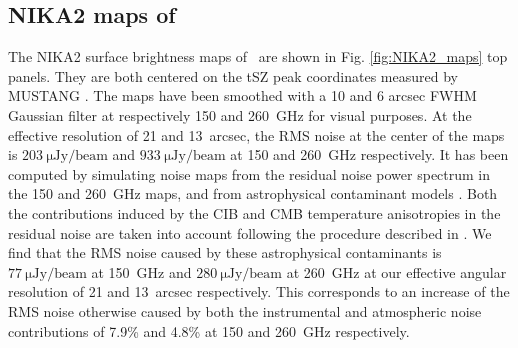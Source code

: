 \documentclass[traditabstract]{aa}
\begin{document}
\subsection{NIKA2 maps of \psz}\label{sec:Raw_NIKA_observations}
The NIKA2 surface brightness maps of \psz\ are shown in Fig. \ref{fig:NIKA2_maps} top panels. They are both centered on the tSZ peak coordinates measured by MUSTANG \citep{you15}. The maps have been smoothed with a 10 and 6 arcsec FWHM Gaussian filter at respectively 150 and 260~GHz for visual purposes. At the effective resolution of 21 and 13~arcsec, the RMS noise at the center of the maps is $203~\mathrm{\mu Jy/beam}$ and $933~\mathrm{\mu Jy/beam}$ at 150 and 260~GHz respectively. It has been computed by simulating noise maps from the residual noise power spectrum in the 150 and 260~GHz maps, and from astrophysical contaminant models \citep{pla14b,bet12,tuc11}. Both the contributions induced by the CIB and CMB temperature anisotropies in the residual noise are taken into account following the procedure described in \cite{ada17b}. We find that the RMS noise caused by these astrophysical contaminants is $77~\mathrm{\mu Jy/beam}$ at 150~GHz and $280~\mathrm{\mu Jy/beam}$ at 260~GHz at our effective angular resolution of 21 and 13~arcsec respectively. This corresponds to an increase of the RMS noise otherwise caused by both the instrumental and atmospheric noise contributions of 7.9\% and 4.8\% at 150 and 260~GHz respectively.\\
\end{document}
